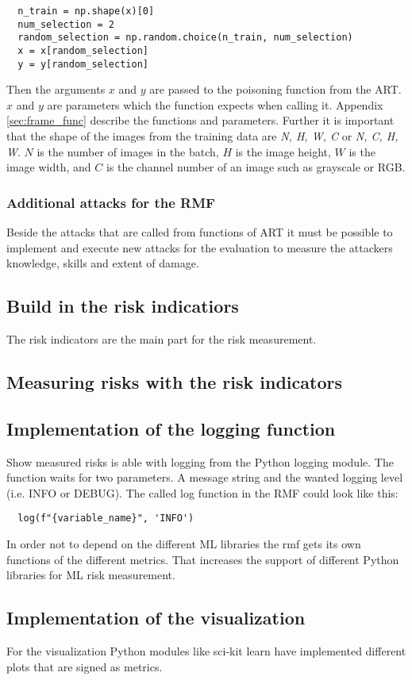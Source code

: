 \begin{lstlisting}
  n_train = np.shape(x)[0]
  num_selection = 2
  random_selection = np.random.choice(n_train, num_selection)
  x = x[random_selection]
  y = y[random_selection]
\end{lstlisting}

Then the arguments $x$ and $y$ are passed to the poisoning function from the ART. $x$ and $y$ are parameters which the function expects when calling it. Appendix \ref{sec:frame_func} describe the functions and parameters. Further it is important that the shape of the images from the training data are \textit{N, H, W, C} or \textit{N, C, H, W}. $N$ is the number of images in the batch, $H$ is the image height, $W$ is the image width, and $C$ is the channel number of an image such as grayscale or RGB.

\subsubsection*{Additional attacks for the RMF}

Beside the attacks that are called from functions of ART it must be possible to implement and execute new attacks for the evaluation to measure the attackers knowledge, skills and extent
of damage.

\subsection{Build in the risk indicatiors}

The risk indicators are the main part for the risk measurement.

\subsection{Measuring risks with the risk indicators}

\subsection{Implementation of the logging function}

Show measured risks is able with logging from the Python logging module. The function waits for two parameters. A message string and the wanted logging level (i.e. INFO or DEBUG). The called log function in the RMF could look like this:
\begin{lstlisting}
  log(f"{variable_name}", 'INFO')
\end{lstlisting}

In order not to depend on the different ML libraries the rmf gets its own functions of the different metrics. That increases the support of different Python libraries for ML risk
measurement.

\subsection{Implementation of the visualization}

For the visualization Python modules like sci-kit learn have implemented different plots that are signed as metrics.
